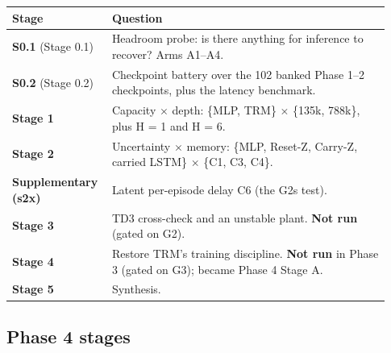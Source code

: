 \documentclass[11pt]{article}
\begin{document}
\begin{center}\small\begin{tabular}{>{\raggedright\arraybackslash}p{0.222\linewidth}>{\raggedright\arraybackslash}p{0.712\linewidth}}
\toprule
Stage & Question \\
\midrule
\textbf{S0.1} (Stage 0.1) & Headroom probe: is there anything for inference to recover? Arms A1--A4. \\
\textbf{S0.2} (Stage 0.2) & Checkpoint battery over the 102 banked Phase 1--2 checkpoints, plus the latency benchmark. \\
\textbf{Stage 1} & Capacity $\times$ depth: \{MLP, TRM\} $\times$ \{135k, 788k\}, plus H = 1 and H = 6. \\
\textbf{Stage 2} & Uncertainty $\times$ memory: \{MLP, Reset-Z, Carry-Z, carried LSTM\} $\times$ \{C1, C3, C4\}. \\
\textbf{Supplementary (s2x)} & Latent per-episode delay C6 (the G2s test). \\
\textbf{Stage 3} & TD3 cross-check and an unstable plant. \textbf{Not run} (gated on G2). \\
\textbf{Stage 4} & Restore TRM's training discipline. \textbf{Not run} in Phase 3 (gated on G3); became Phase 4 Stage A. \\
\textbf{Stage 5} & Synthesis. \\
\bottomrule
\end{tabular}\end{center}



\subsection*{Phase 4 stages}
\end{document}
